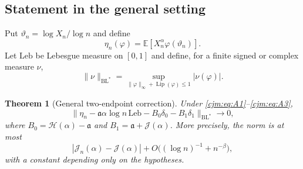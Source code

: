 \documentclass[11pt,a4paper]{article}
\newtheorem{theorem}{Theorem}[section]
\theoremstyle{definition}\newaliascnt{definition}{theorem}
\theoremstyle{remark}\newaliascnt{remark}{theorem}
\newcommand{\ljE}{\mathbb E}
\newcommand{\cjLip}{\operatorname{Lip}}
\newcommand{\cjBL}{\mathrm{BL}}
\newcommand{\cjLeb}{\mathrm{Leb}}
\begin{document}
\subsection{Statement in the general setting}
Put $\vartheta_n=\log X_n/\log n$ and define
\[
 \eta_n(\varphi)=\ljE[X_n^\alpha\varphi(\vartheta_n)].
\]
Let $\cjLeb$ be Lebesgue measure on $[0,1]$ and define, for a finite signed
or complex measure $\nu$,
\[
 \|\nu\|_{\cjBL^*}
 =\sup_{\|\varphi\|_\infty+\cjLip(\varphi)\le1}|\nu(\varphi)|.
\]

\begin{theorem}[General two-endpoint correction]
\label{cjm:thm:general-measure}
Under \eqref{cjm:eq:A1}--\eqref{cjm:eq:A3},
\begin{equation}
 \|\eta_n-\mathfrak a\alpha\log n\,\cjLeb-B_0\delta_0-B_1\delta_1\|_{\cjBL^*}
 \longrightarrow0,
 \label{cjm:eq:BL-general}
\end{equation}
where $B_0=\mathcal H(\alpha)-\mathfrak a$ and
$B_1=\mathfrak a+\mathcal J(\alpha)$. More precisely, the norm is at most
\begin{equation}
 |\mathcal J_n(\alpha)-\mathcal J(\alpha)|+
 O\bigl((\log n)^{-1}+n^{-\beta}\bigr),
 \label{cjm:eq:BL-bound}
\end{equation}
with a constant depending only on the hypotheses.
\end{theorem}
\end{document}
